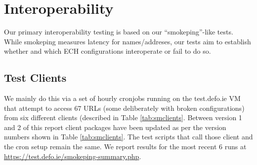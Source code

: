 \section{Interoperability}

Our primary interoperability testing is based on our ``smokeping''-like tests.
While smokeping measures latency for names/addreses, our tests aim to establish
whether and which ECH configurations interoperate or fail to do so.

\subsection{Test Clients}

We mainly do this via a set of hourly cronjobs running on the test.defo.ie VM
that attempt to access 67 URLs (some deliberately with broken configurations)
from six different clients (described in Table \ref{tab:smclients}.
Between version 1 and 2 of this report client packages have been updated as
per the version numbers shown in Table \ref{tab:smclients}. The test scripts
that call those client and the cron setup remain the same.
We report results for the most recent 6 runs at
\url{https://test.defo.ie/smokeping-summary.php}.

